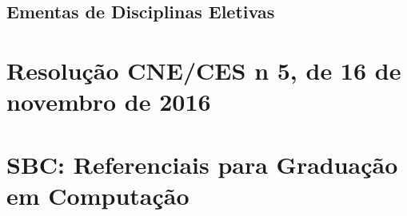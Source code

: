 \section{Ementas de Disciplinas Eletivas}
\pagebreak











\chapter{Resolução CNE/CES n\textordmasculine{} 5, de 16 de novembro de 2016}
\label{cne2016}

\chapter{SBC: Referenciais para Graduação em Computação}
\label{sbc2017}


